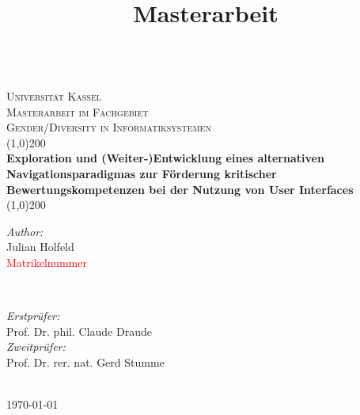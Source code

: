 \begin{titlepage}
    \centering
    \title{Masterarbeit}
    \vspace{2cm}
    \vspace{1cm}
    \textsc{\LARGE \\ Universität Kassel}\\[0.5cm] 
    \textsc{\large Masterarbeit im Fachgebiet}\\[0.5cm] 
    \textsc{\large Gender/Diversity in Informatiksystemen}\\[0.5cm] 

    \vspace{1.4cm}
    \line(1,0){200}
    \vspace{0.4cm}
    { \large \bfseries \\ Exploration und (Weiter-)Entwicklung eines alternativen Navigationsparadigmas zur Förderung kritischer Bewertungskompetenzen bei der Nutzung von User Interfaces}\\[0.2cm]
    \line(1,0){200}
    \vspace{1.5cm}\\

    \vspace{5cm}
    \begin{minipage}{0.4\textwidth}
        \begin{flushleft}
            \large\emph{Author:}\\
            Julian Holfeld\\
            \textcolor{red}{Matrikelnummer}
        \end{flushleft}
    \end{minipage}~
    \begin{minipage}{0.4\textwidth}
        \begin{flushright}
            \large\emph{Erstprüfer:}\\
            Prof. Dr. phil. Claude Draude\\
            \large\emph{Zweitprüfer:}\\
            Prof. Dr. rer. nat. Gerd Stumme
        \end{flushright}
    \end{minipage}\\[2cm]
    {\large \today}\\[2cm]
    \vfill
\end{titlepage}
